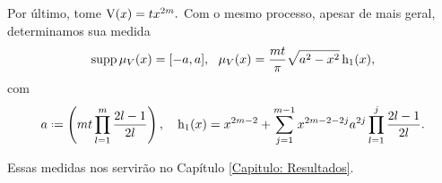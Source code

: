  
 Por último, tome $\operatorname{V}(x) = t x^{2m}.$ Com o mesmo processo, apesar de mais geral, determinamos sua medida 
 \begin{equation}
 	\operatorname{supp} \mu_V(x) = [-a, a], \ \ \mu_V(x) = \frac{mt}{\pi} \sqrt{a^2 - x^2} \operatorname{h_1}(x),
 	\label{Equação: Mônico}
 \end{equation}
com $$ a \deff \left( mt \prod_{l=1}^{m} \frac{2l-1}{2l}\right), \ \ \ \h(x) = x^{2m-2} + \sum_{j=1}^{m-1} x^{2m-2-2j} a^{2j} \prod_{l=1}^{j} \frac{2l-1}{2l}.$$

Essas medidas nos servirão no Capítulo \ref{Capitulo: Resultados}.
